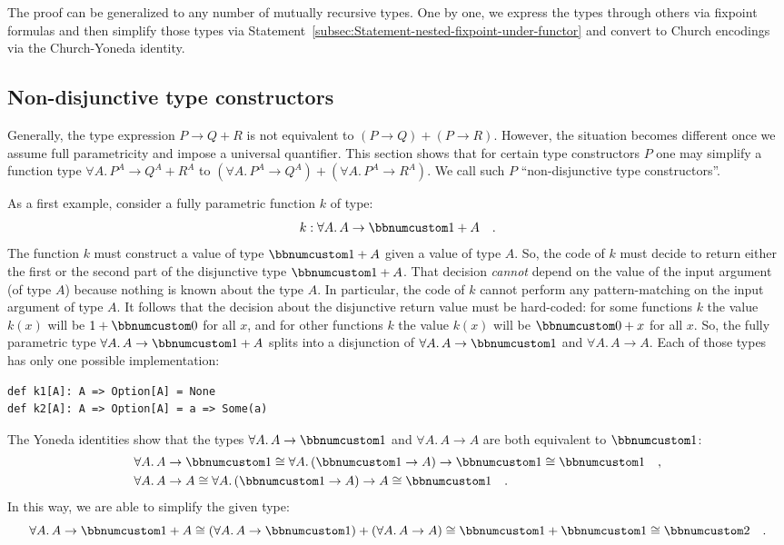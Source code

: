 The proof can be generalized to any number of mutually recursive types.
One by one, we express the types through others via fixpoint formulas
and then simplify those types via Statement~\ref{subsec:Statement-nested-fixpoint-under-functor}
and convert to Church encodings via the Church-Yoneda identity.

\subsection{Non-disjunctive type constructors\label{subsec:Non-disjunctive-type-constructors}}

Generally, the type expression $P\rightarrow Q+R$ is not equivalent
to $(P\rightarrow Q)+(P\rightarrow R)$. However, the situation becomes
different once we assume full parametricity and impose a universal
quantifier. This section shows that for certain type constructors
$P$ one may simplify a function type $\forall A.\,P^{A}\rightarrow Q^{A}+R^{A}$
to $(\forall A.\,P^{A}\rightarrow Q^{A})+(\forall A.\,P^{A}\rightarrow R^{A})$.
We call such $P$ \textsf{``}non-disjunctive type constructors\textsf{''}.

As a first example, consider a fully parametric function $k$ of type:
\[
k:\forall A.\,A\rightarrow\bbnum 1+A\quad.
\]
The function $k$ must construct a value of type $\bbnum 1+A$ given
a value of type $A$. So, the code of $k$ must decide to return either
the first or the second part of the disjunctive type $\bbnum 1+A$.
That decision \emph{cannot} depend on the value of the input argument
(of type $A$) because nothing is known about the type $A$. In particular,
the code of $k$ cannot perform any pattern-matching on the input
argument of type $A$. It follows that the decision about the disjunctive
return value must be hard-coded: for some functions $k$ the value
$k(x)$ will be $1+\bbnum 0$ for all $x$, and for other functions
$k$ the value $k(x)$ will be $\bbnum 0+x$ for all $x$. So, the
fully parametric type $\forall A.\,A\rightarrow\bbnum 1+A$ splits
into a disjunction of $\forall A.\,A\rightarrow\bbnum 1$ and $\forall A.\,A\rightarrow A$.
Each of those types has only one possible implementation:
\begin{lstlisting}
def k1[A]: A => Option[A] = None
def k2[A]: A => Option[A] = a => Some(a)
\end{lstlisting}
The Yoneda identities show that the types $\forall A.\,A\rightarrow\bbnum 1$
and $\forall A.\,A\rightarrow A$ are both equivalent to $\bbnum 1$:
\begin{align*}
 & \forall A.\,A\rightarrow\bbnum 1\cong\forall A.\,(\bbnum 1\rightarrow A)\rightarrow\bbnum 1\cong\bbnum 1\quad,\\
 & \forall A.\,A\rightarrow A\cong\forall A.\,(\bbnum 1\rightarrow A)\rightarrow A\cong\bbnum 1\quad.
\end{align*}
In this way, we are able to simplify the given type:
\[
\forall A.\,A\rightarrow\bbnum 1+A\cong(\forall A.\,A\rightarrow\bbnum 1)+(\forall A.\,A\rightarrow A)\cong\bbnum 1+\bbnum 1\cong\bbnum 2\quad.
\]

